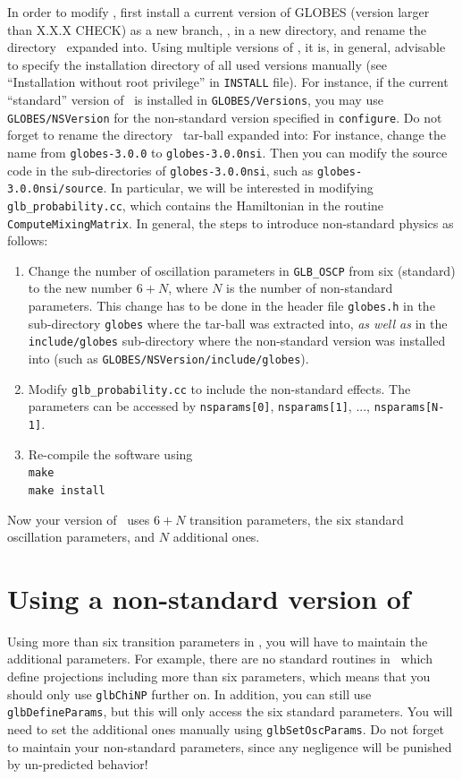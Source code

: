 In order to modify \GLOBES , first install a current version of GLOBES (version larger than X.X.X CHECK) as
a new branch, \ie, in a new directory, and rename the directory \GLOBES\ expanded into. 
Using multiple versions of \GLOBES , it is, in general, advisable
to specify the installation directory of all used versions manually (see ``Installation without
root privilege'' in {\tt INSTALL} file). For instance, if the current ``standard'' version of \GLOBES\ is
installed in {\tt GLOBES/Versions}, you may use {\tt GLOBES/NSVersion} for the non-standard version
specified in {\tt configure}. Do not forget to rename the directory \GLOBES\ tar-ball expanded into: For instance,
change the name from {\tt globes-3.0.0} to {\tt globes-3.0.0nsi}. 
Then you can modify the source code in the sub-directories of {\tt globes-3.0.0nsi}, such as {\tt globes-3.0.0nsi/source}.
In particular, we will be interested in modifying {\tt glb\_probability.cc}, which contains the
Hamiltonian in the routine {\tt ComputeMixingMatrix}.
%
In general, the steps to introduce non-standard physics as follows:
\begin{enumerate}
\item
 Change the number of oscillation parameters in {\tt GLB\_OSCP} from six (standard) to the
 new number $6+N$, where $N$ is the number of non-standard parameters. 
 This change has to be done in the header file {\tt globes.h} in the sub-directory {\tt globes}
 where the tar-ball was extracted into,  {\em as well as} in the {\tt include/globes} sub-directory
 where the non-standard version was installed into (such as {\tt GLOBES/NSVersion/include/globes}).
\item 
 Modify {\tt glb\_probability.cc} to include the non-standard effects. The parameters
 can be accessed by {\tt nsparams[0]}, {\tt nsparams[1]}, ..., {\tt nsparams[N-1]}.
\item
 Re-compile the software using \\
 {\tt make} \\
 {\tt make install}
\end{enumerate}
Now your version of \GLOBES\ uses $6+N$ transition parameters, the six standard oscillation parameters,
and $N$ additional ones. 

\section{Using a non-standard version of \GLOBES }

Using more than six transition parameters in \GLOBES , you will have to maintain the additional parameters. 
For example, there are no standard routines in \GLOBES\ which define projections including more than six parameters, 
which means that you should only use {\tt glbChiNP} further on. In addition, you can still use {\tt glbDefineParams}, but this 
will only access the six standard parameters. You will need to set the additional ones manually using {\tt glbSetOscParams}. 
Do not forget to maintain your non-standard parameters, since any negligence will be punished by un-predicted behavior!

